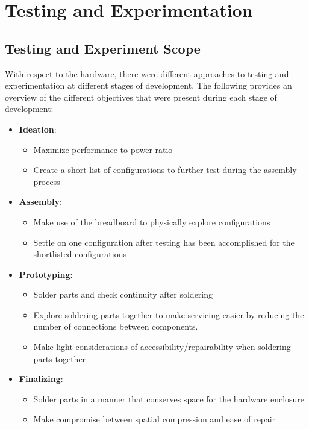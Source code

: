 \section{Testing and Experimentation}\label{sec:testing-and-experimentation}

\subsection{Testing and Experiment Scope}\label{subsec:testing-and-experiment-scope}

With respect to the hardware, there were different approaches
to testing and experimentation
at different stages of development.
The following provides an overview of the different objectives that were present during each stage of development:

\begin{itemize}
    \item \textbf{Ideation}:
    \begin{itemize}
        \item Maximize performance to power ratio
        \item Create a short list of configurations to further test
        during the assembly process
    \end{itemize}
    \item \textbf{Assembly}:
    \begin{itemize}
        \item Make use of the breadboard to physically explore configurations
        \item Settle on one configuration after testing has been
        accomplished for the shortlisted configurations
    \end{itemize}
    \item \textbf{Prototyping}:
    \begin{itemize}
        \item Solder parts and check continuity after soldering
        \item Explore soldering parts together to make servicing easier
        by reducing the number of connections between components.
        \item Make light considerations of accessibility/repairability when soldering parts together
    \end{itemize}
    \item \textbf{Finalizing}:
    \begin{itemize}
        \item Solder parts in a manner that conserves space for the hardware enclosure
        \item Make compromise between spatial compression and ease of repair
    \end{itemize}
\end{itemize}

